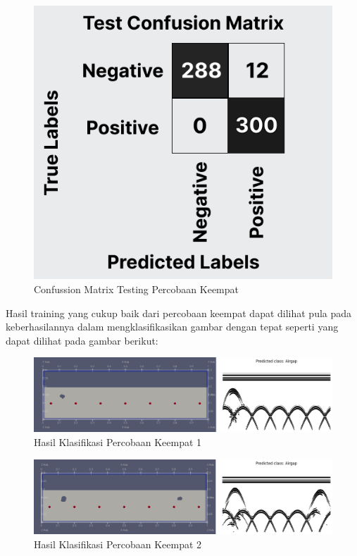 \begin{figure} [H] \centering
    \includegraphics[scale=0.3]{gambar/bab4/testcon4.png}
    \caption{Confussion Matrix Testing Percobaan Keempat}
    \label{fig:testcon4}
\end{figure}

Hasil training yang cukup baik dari percobaan keempat dapat dilihat pula pada keberhasilannya dalam mengklasifikasikan gambar dengan tepat seperti yang dapat dilihat pada gambar berikut:

\begin{figure} [H] \centering
    \includegraphics[scale=0.2]{gambar/bab4/Airgap 19994.png}
    \caption{Hasil Klasifikasi Percobaan Keempat 1}
\end{figure}

\begin{figure} [H] \centering
    \includegraphics[scale=0.2]{gambar/bab4/Airgap 20004.png}
    \caption{Hasil Klasifikasi Percobaan Keempat 2}
\end{figure}

